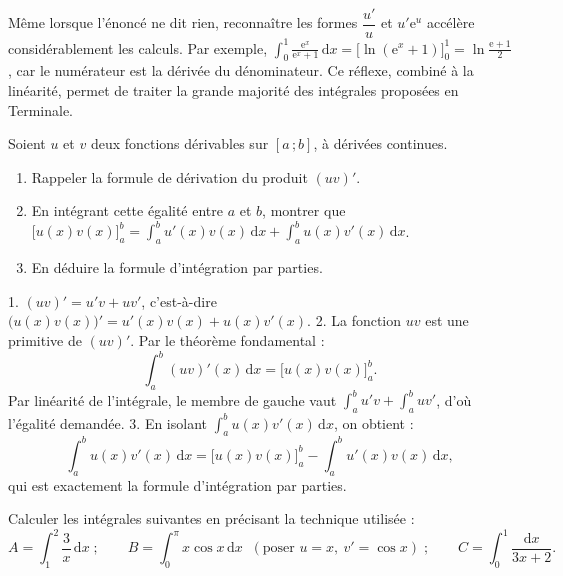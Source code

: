 \documentclass[11pt]{article}
\begin{document}
\begin{savaistu}
Même lorsque l'énoncé ne dit rien, reconnaître les formes $\dfrac{u'}{u}$ et $u'\mathrm{e}^u$ accélère considérablement les calculs. Par exemple, $\displaystyle\int_0^1 \frac{\mathrm{e}^x}{\mathrm{e}^x + 1}\,\mathrm{d}x = \big[\ln(\mathrm{e}^x+1)\big]_0^1 = \ln\frac{\mathrm{e}+1}{2}$, car le numérateur est la dérivée du dénominateur. Ce réflexe, combiné à la linéarité, permet de traiter la grande majorité des intégrales proposées en Terminale.
\end{savaistu}

\begin{exercice}
Soient $u$ et $v$ deux fonctions dérivables sur $[a\,;b]$, à dérivées continues.
\begin{enumerate}
\item Rappeler la formule de dérivation du produit $(uv)'$.
\item En intégrant cette égalité entre $a$ et $b$, montrer que $\big[u(x)v(x)\big]_a^b = \displaystyle\int_a^b u'(x)v(x)\,\mathrm{d}x + \int_a^b u(x)v'(x)\,\mathrm{d}x$.
\item En déduire la formule d'intégration par parties.
\end{enumerate}
\end{exercice}

\begin{corrige}[Exercice 1]
1. $(uv)' = u'v + uv'$, c'est-à-dire $\big(u(x)v(x)\big)' = u'(x)v(x) + u(x)v'(x)$.
2. La fonction $uv$ est une primitive de $(uv)'$. Par le théorème fondamental :
\[ \int_a^b (uv)'(x)\,\mathrm{d}x = \big[u(x)v(x)\big]_a^b. \]
Par linéarité de l'intégrale, le membre de gauche vaut $\displaystyle\int_a^b u'v + \int_a^b uv'$, d'où l'égalité demandée.
3. En isolant $\displaystyle\int_a^b u(x)v'(x)\,\mathrm{d}x$, on obtient :
\[ \int_a^b u(x)v'(x)\,\mathrm{d}x = \big[u(x)v(x)\big]_a^b - \int_a^b u'(x)v(x)\,\mathrm{d}x, \]
qui est exactement la formule d'intégration par parties.
\end{corrige}

\begin{exercice}
Calculer les intégrales suivantes en précisant la technique utilisée :
\[ A = \int_1^2 \frac{3}{x}\,\mathrm{d}x \;;\qquad B = \int_0^{\pi} x\cos x\,\mathrm{d}x \;\;(\text{poser } u = x,\ v' = \cos x) \;;\qquad C = \int_0^1 \frac{\mathrm{d}x}{3x+2}. \]
\end{exercice}
\end{document}
